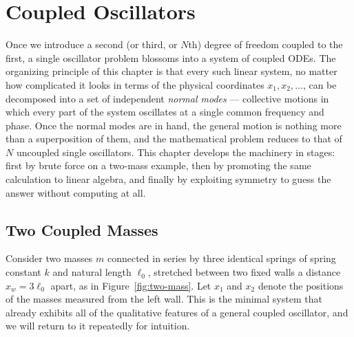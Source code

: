 \chapter{Coupled Oscillators}

Once we introduce a second (or third, or $N$th) degree of freedom coupled to the first, a single oscillator problem blossoms into a system of coupled ODEs. The organizing principle of this chapter is that every such linear system, no matter how complicated it looks in terms of the physical coordinates $x_1, x_2, \ldots$, can be decomposed into a set of independent \emph{normal modes} --- collective motions in which every part of the system oscillates at a single common frequency and phase. Once the normal modes are in hand, the general motion is nothing more than a superposition of them, and the mathematical problem reduces to that of $N$ uncoupled single oscillators. This chapter develops the machinery in stages: first by brute force on a two-mass example, then by promoting the same calculation to linear algebra, and finally by exploiting symmetry to guess the answer without computing at all.

\section{Two Coupled Masses}

Consider two masses $m$ connected in series by three identical springs of spring constant $k$ and natural length $\ell_0$, stretched between two fixed walls a distance $x_w = 3\ell_0$ apart, as in Figure~\ref{fig:two-mass}. Let $x_1$ and $x_2$ denote the positions of the masses measured from the left wall. This is the minimal system that already exhibits all of the qualitative features of a general coupled oscillator, and we will return to it repeatedly for intuition.

